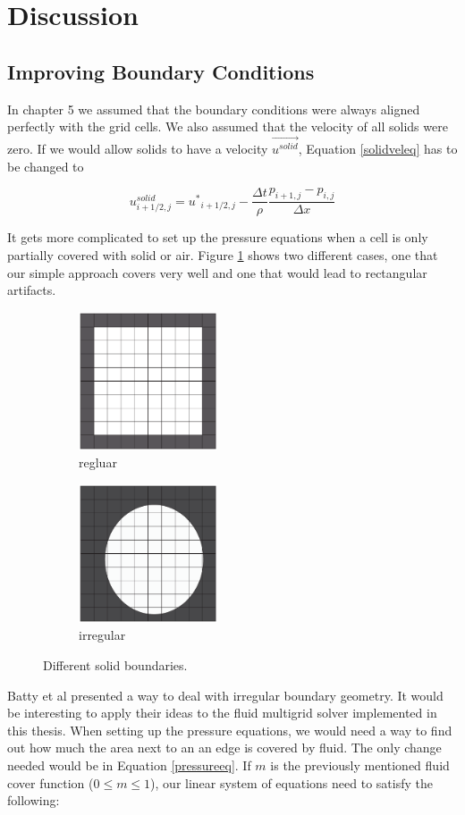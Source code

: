 \section{Discussion}
\subsection{Improving Boundary Conditions}
In chapter 5 we assumed that the boundary conditions were always aligned perfectly with the grid cells. We also assumed that the velocity of all solids were zero. If we would allow solids to have a velocity $\vec{u^{solid}}$, Equation \ref{solidveleq} has to be changed to

\begin{equation}
u^{solid}_{i+1/2,j}  = {u^*}_{i+1/2,j} - \frac{\Delta t }{\rho}\frac{p_{i+1,j} - p_{i,j}}{\Delta x}
\end{equation}

\noindent
It gets more complicated to set up the pressure equations when a cell is only partially covered with solid or air. Figure \ref{boundarycases} shows two different cases, one that our simple approach covers very well and one that would lead to rectangular artifacts.

\begin{figure}[ht!]
\centering
\begin{subfigure}[c]{0.3\textwidth}
\includegraphics[height=41mm]{img/boundary1.pdf}
\caption{regluar}
\end{subfigure}
\begin{subfigure}[c]{0.3\textwidth}
\includegraphics[height=41mm]{img/boundary2.pdf}
\caption{irregular}
\end{subfigure}
\caption{Different solid boundaries.}
\label{boundarycases}
\end{figure}
\noindent
Batty et al \cite{batty} presented a way to deal with irregular boundary geometry. It would be interesting to apply their ideas to the fluid multigrid solver implemented in this thesis. When setting up the pressure equations, we would need a way to find out how much the area next to an an edge is covered by fluid. The only change needed would be in Equation \ref{pressureeq}. If $m$ is the previously mentioned fluid cover function ($0 \leq m \leq 1$), our linear system of equations need to satisfy the following:

